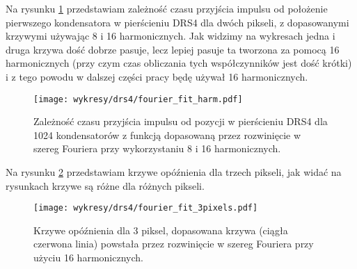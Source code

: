\documentclass[a4paper,11pt,twoside]{article}
\begin{document}
Na rysunku \ref{fig:fourier_fit_harm} przedstawiam zależność czasu przyjścia impulsu od położenie pierwszego kondensatora w pierścieniu DRS4 dla dwóch pikseli, z dopasowanymi krzywymi używając 8 i 16 harmonicznych. Jak widzimy na wykresach jedna i druga krzywa dość dobrze pasuje, lecz lepiej pasuje ta tworzona za pomocą 16 harmonicznych (przy czym czas obliczania tych współczynników jest dość krótki) i z tego powodu w dalszej części pracy będę używał 16 harmonicznych.
\begin{figure}[H] 
\centering
\texttt{[image: wykresy/drs4/fourier\_fit\_harm.pdf]}
\caption{Zależność czasu przyjścia impulsu od pozycji w pierścieniu DRS4 dla 1024 kondensatorów z funkcją dopasowaną przez rozwinięcie w szereg Fouriera przy wykorzystaniu 8 i 16 harmonicznych.}
\label{fig:fourier_fit_harm}
\end{figure}
\newpage
Na rysunku \ref{fig:fourier_fit_3} przedstawiam krzywe opóźnienia dla trzech pikseli, jak widać na rysunkach krzywe są różne dla różnych pikseli. 
\begin{figure}[H] 
\centering
\texttt{[image: wykresy/drs4/fourier\_fit\_3pixels.pdf]}
\caption{Krzywe opóźnienia dla 3 piksel, dopasowana krzywa (ciągła czerwona linia) powstała przez rozwinięcie w szereg Fouriera przy użyciu 16 harmonicznych.}
\label{fig:fourier_fit_3}
\end{figure}
\end{document}
